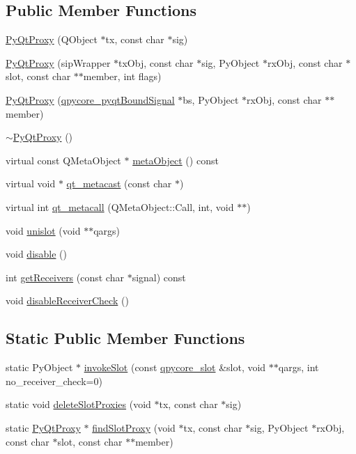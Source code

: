\subsection*{Public Member Functions}
\begin{DoxyCompactItemize}
\item 
\hyperlink{classPyQtProxy_aa238baaedaf8a815c8d3b61131645128}{Py\+Qt\+Proxy} (Q\+Object $\ast$tx, const char $\ast$sig)
\item 
\hyperlink{classPyQtProxy_afaa244f008c84816f1289876a00224fc}{Py\+Qt\+Proxy} (sip\+Wrapper $\ast$tx\+Obj, const char $\ast$sig, Py\+Object $\ast$rx\+Obj, const char $\ast$slot, const char $\ast$$\ast$member, int flags)
\item 
\hyperlink{classPyQtProxy_aa6b268857d7e685c631ab3121aab1b6e}{Py\+Qt\+Proxy} (\hyperlink{structqpycore__pyqtBoundSignal}{qpycore\+\_\+pyqt\+Bound\+Signal} $\ast$bs, Py\+Object $\ast$rx\+Obj, const char $\ast$$\ast$member)
\item 
\hyperlink{classPyQtProxy_aa42704ae477600dbcaa8041f00e49ec8}{$\sim$\+Py\+Qt\+Proxy} ()
\item 
virtual const Q\+Meta\+Object $\ast$ \hyperlink{classPyQtProxy_af3053871f9e5cce51a9caac6c1393019}{meta\+Object} () const 
\item 
virtual void $\ast$ \hyperlink{classPyQtProxy_a8e08ce5f82a0b88e0026b6f6705f7b14}{qt\+\_\+metacast} (const char $\ast$)
\item 
virtual int \hyperlink{classPyQtProxy_ad6a962613ed92cd8503151741d325f87}{qt\+\_\+metacall} (Q\+Meta\+Object\+::\+Call, int, void $\ast$$\ast$)
\item 
void \hyperlink{classPyQtProxy_ad1b64cd1c4d26d874c293608d10f0d9e}{unislot} (void $\ast$$\ast$qargs)
\item 
void \hyperlink{classPyQtProxy_a06905b1a48d46fdc5c3c75eb41d0fbf2}{disable} ()
\item 
int \hyperlink{classPyQtProxy_a88d9af30abcec8669fa3393c803c68fc}{get\+Receivers} (const char $\ast$signal) const 
\item 
void \hyperlink{classPyQtProxy_a4700c155143c5424b1797692b620538a}{disable\+Receiver\+Check} ()
\end{DoxyCompactItemize}
\subsection*{Static Public Member Functions}
\begin{DoxyCompactItemize}
\item 
static Py\+Object $\ast$ \hyperlink{classPyQtProxy_a67e7bcffdd0cbd7bf41d6d7109ef1b29}{invoke\+Slot} (const \hyperlink{structqpycore__slot}{qpycore\+\_\+slot} \&slot, void $\ast$$\ast$qargs, int no\+\_\+receiver\+\_\+check=0)
\item 
static void \hyperlink{classPyQtProxy_a3318ca69a024d3ed5a3b413369e82e21}{delete\+Slot\+Proxies} (void $\ast$tx, const char $\ast$sig)
\item 
static \hyperlink{classPyQtProxy}{Py\+Qt\+Proxy} $\ast$ \hyperlink{classPyQtProxy_a799e3ed40ece822363b6653619894e48}{find\+Slot\+Proxy} (void $\ast$tx, const char $\ast$sig, Py\+Object $\ast$rx\+Obj, const char $\ast$slot, const char $\ast$$\ast$member)
\end{DoxyCompactItemize}
